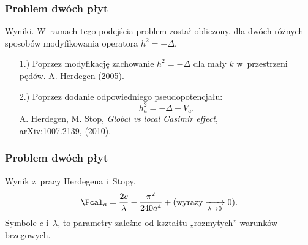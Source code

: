 \documentclass[10pt,t]{beamer}
\begin{document}
\begin{frame}
  \frametitle{Problem dwóch płyt}


  Wyniki. W~ramach tego podejścia problem został obliczony, dla dwóch
  różnych sposobów modyfikowania operatora $h^{ 2 } = -\Delta$.
  \begin{itemize}
    \RaggedRight

  \item[1.)] Poprzez modyfikację zachowanie $h^{ 2 } = -\Delta$
    dla mały $k$ w~przestrzeni pędów. A. Herdegen (2005).

  \item[2.)] Poprzez dodanie odpowiedniego pseudopotencjału:
    \begin{equation}
      \label{eq:Efekt-Casimira-17}
      h_{ a }^{ 2 } = -\Delta + V_{ a }.
    \end{equation}
    A. Herdegen, M. Stop, \textit{Global vs local Casimir effect}, \\
    arXiv:1007.2139, (2010).

  \end{itemize}

\end{frame}





\begin{frame}
  \frametitle{Problem dwóch płyt}


  Wynik z~pracy Herdegena i~Stopy.
  \begin{equation}
    \label{eq:Efekt-Casimira-18}
    \Fcal_{ a } =
    \frac{ 2 c }{ \lambda } - \frac{ \pi^{ 2 } }{ 240 a^{ 4 } }
    + ( \textrm{wyrazy} \xrightarrow[ \lambda \to 0 ]{} 0 ).
  \end{equation}
  Symbole $c$ i~$\lambda$, to parametry zależne od kształtu „rozmytych” warunków
  brzegowych.

\end{frame}
\end{document}
